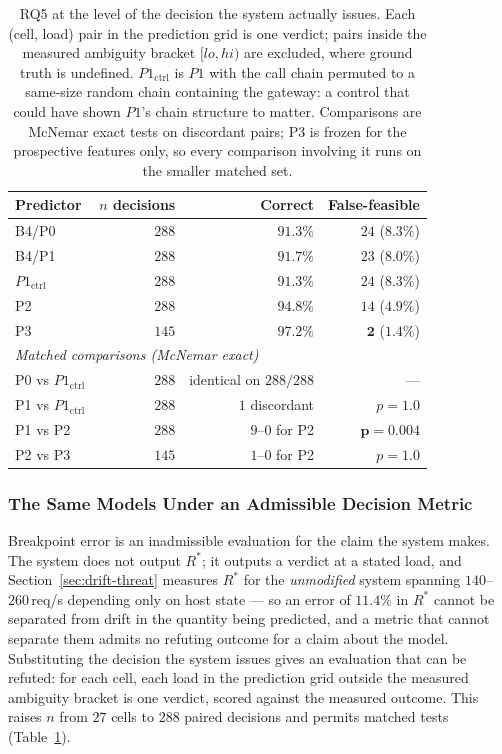 \documentclass[journal, 10pt]{IEEEtran}
\begin{document}
\begin{table}[!t]
\centering
\caption{RQ5 at the level of the decision the system actually issues. Each
(cell, load) pair in the prediction grid is one verdict; pairs inside the
measured ambiguity bracket $[lo,hi)$ are excluded, where ground truth is
undefined. $P1_{\text{ctrl}}$ is $P1$ with the call chain permuted to a
same-size random chain containing the gateway: a control that could have shown
$P1$'s chain structure to matter. Comparisons are McNemar exact tests on
discordant pairs; P3 is frozen for the prospective features only, so every
comparison involving it runs on the smaller matched set.}
\label{tab:rq6-verdict}
\begin{tabular}{lrrr}
\toprule
Predictor & $n$ decisions & Correct & False-feasible \\
\midrule
B4/P0                   & $288$ & $91.3\%$ & $24$ ($8.3\%$) \\
B4/P1                   & $288$ & $91.7\%$ & $23$ ($8.0\%$) \\
$P1_{\text{ctrl}}$      & $288$ & $91.3\%$ & $24$ ($8.3\%$) \\
P2                      & $288$ & $\mathbf{94.8\%}$ & $14$ ($4.9\%$) \\
P3                      & $145$ & $\mathbf{97.2\%}$ & $\mathbf{2}$ ($1.4\%$) \\
\midrule
\multicolumn{4}{l}{\emph{Matched comparisons (McNemar exact)}} \\
P0 vs $P1_{\text{ctrl}}$ & $288$ & identical on $288/288$ & --- \\
P1 vs $P1_{\text{ctrl}}$ & $288$ & $1$ discordant & $p=1.0$ \\
P1 vs P2                 & $288$ & $9$--$0$ for P2 & $\mathbf{p=0.004}$ \\
P2 vs P3                 & $145$ & $1$--$0$ for P2 & $p=1.0$ \\
\bottomrule
\end{tabular}
\end{table}

\subsubsection{The Same Models Under an Admissible Decision Metric}
\label{sec:rq6-verdict}
Breakpoint error is an inadmissible evaluation for the claim the system makes.
The system does not output $R^{*}$; it outputs a verdict at a stated load, and
Section~\ref{sec:drift-threat} measures $R^{*}$ for the \emph{unmodified} system
spanning $140$--$260\,$req/s depending only on host state --- so an error of
$11.4\%$ in $R^{*}$ cannot be separated from drift in the quantity being
predicted, and a metric that cannot separate them admits no refuting outcome for
a claim about the model. Substituting the decision the system issues gives an evaluation that
can be refuted: for each cell, each load in the prediction grid outside the
measured ambiguity bracket is one verdict, scored against the measured outcome.
This raises $n$ from $27$ cells to $288$ paired decisions and permits matched
tests (Table~\ref{tab:rq6-verdict}).
\end{document}
